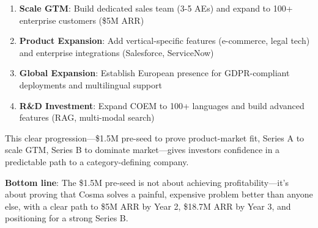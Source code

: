 \begin{enumerate}[noitemsep]
    \item \textbf{Scale GTM}: Build dedicated sales team (3-5 AEs) and expand to 100+ enterprise customers (\$5M ARR)
    
    \item \textbf{Product Expansion}: Add vertical-specific features (e-commerce, legal tech) and enterprise integrations (Salesforce, ServiceNow)
    
    \item \textbf{Global Expansion}: Establish European presence for GDPR-compliant deployments and multilingual support
    
    \item \textbf{R\&D Investment}: Expand COEM to 100+ languages and build advanced features (RAG, multi-modal search)
\end{enumerate}

\vspace{0.5cm}

This clear progression—\$1.5M pre-seed to prove product-market fit, Series A to scale GTM, Series B to dominate market—gives investors confidence in a predictable path to a category-defining company.

\vspace{0.3cm}

\textbf{Bottom line}: The \$1.5M pre-seed is not about achieving profitability—it's about proving that Cosma solves a painful, expensive problem better than anyone else, with a clear path to \$5M ARR by Year 2, \$18.7M ARR by Year 3, and positioning for a strong Series B.
